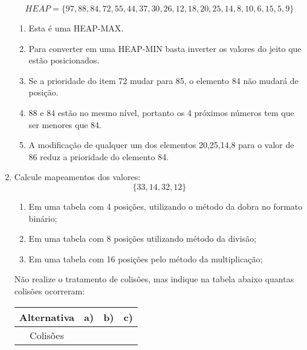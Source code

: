 \documentclass[11pt]{article}
\begin{document}
\begin{enumerate}[label=\textbf{Q\arabic*}]
          $$HEAP = \{97, 88, 84, 72, 55, 44, 37, 30, 26, 12, 18, 20, 25, 14, 8, 10, 6, 15, 5, 9\}$$
          \begin{enumerate}
              \item Esta é uma HEAP-MAX.
              \item Para converter em uma HEAP-MIN basta inverter os valores do jeito que estão posicionados.
              \item Se a prioridade do item 72 mudar para 85, o elemento 84 não mudará de posição.
              \item 88 e 84 estão no mesmo nível, portanto os 4 próximos números tem que ser menores que 84.
              \item A modificação de qualquer um dos elementos 20,25,14,8 para o valor de 86 reduz a prioridade do elemento 84.
          \end{enumerate}

    \item Calcule mapeamentos dos valores:
          $$\{33,14,32,12\}$$
          \begin{enumerate}
              \item Em uma tabela com 4 posições, utilizando o método da dobra no formato binário;
              \item Em uma tabela com 8 posições utilizando método da divisão;
              \item Em uma tabela com 16 posições pelo método da multiplicação;
          \end{enumerate}
          Não realize o tratamento de colisões, mas indique na tabela abaixo quantas colisões ocorreram:
          \begin{center}
              \begin{tabular}{|c|c|c|c|}
                  \hline
                  Alternativa & a) & b) & c) \\
                  \hline
                  Colisões    & \  & \  & \  \\
                  \hline
              \end{tabular}
          \end{center}
\end{enumerate}
\end{document}
